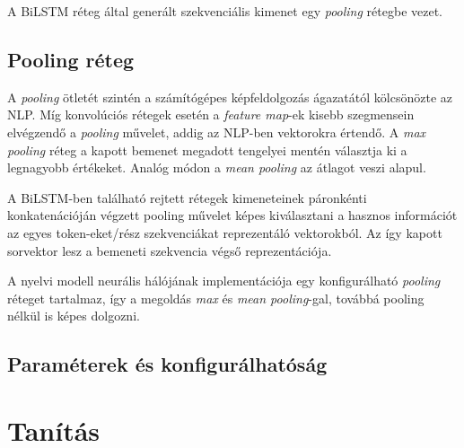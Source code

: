 A BiLSTM réteg által generált szekvenciális kimenet egy \textit{pooling} rétegbe vezet.

\subsection{Pooling réteg}

A \textit{pooling} ötletét szintén a számítógépes képfeldolgozás ágazatától kölcsönözte az NLP. Míg konvolúciós rétegek esetén a \textit{feature map}-ek kisebb szegmensein elvégzendő a \textit{pooling} művelet, addig az NLP-ben vektorokra értendő.
A \textit{max pooling} réteg a kapott bemenet megadott tengelyei mentén választja ki a legnagyobb értékeket. Analóg módon a \textit{mean pooling} az átlagot veszi alapul.

A BiLSTM-ben található rejtett rétegek kimeneteinek páronkénti konkatenációján végzett pooling művelet képes kiválasztani a hasznos információt az egyes token-eket/rész szekvenciákat reprezentáló vektorokból. Az így kapott sorvektor lesz a bemeneti szekvencia végső reprezentációja.

A nyelvi modell neurális hálójának implementációja egy konfigurálható \textit{pooling} réteget tartalmaz, így a megoldás \textit{max} és \textit{mean pooling}-gal, továbbá pooling nélkül is képes dolgozni.

\subsection{Paraméterek és konfigurálhatóság}



\iffalse

# Config
w2v_dim = 300
batch_size = 32
use_embedding_layer = True
if use_embedding_layer:
	num_inputs = 1
else:
	num_inputs = w2v_dim + 4

num_hidden = 1024
dropout_keep_prob = 0.5
pooling = 'max'

\fi

\section{Tanítás}